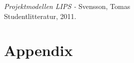 \documentclass[a4paper,12pt]{article}
\begin{document}
% 
\newpage

\begin{thebibliography}{99}
\textit{Projektmodellen LIPS - } Svensson, Tomas
\\Studentlitteratur, 2011.
\end{thebibliography}
\newpage

\appendix
\section{Appendix}
\label{LetterOA}

\subsection{}
\end{document}
